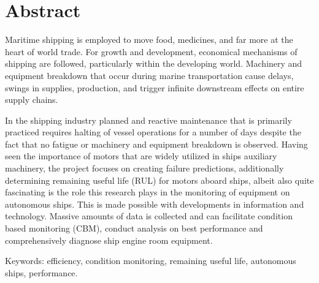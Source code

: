 
\section*{Abstract}
\label{sec:Abstract}
Maritime shipping is employed to move food, medicines, and far more at the heart of world
trade. For growth and development, economical mechanisms of shipping are followed,
particularly within the developing world. Machinery and equipment breakdown that occur
during marine transportation cause delays, swings in supplies, production, and trigger
infinite downstream effects on entire supply chains.

 In the shipping industry planned and
reactive maintenance that is primarily practiced requires halting of vessel operations for a
number of days despite the fact that no fatigue or machinery and equipment breakdown is
observed. Having seen the importance of motors that are widely utilized in ships auxiliary
machinery, the project focuses on creating failure predictions, additionally determining
remaining useful life (RUL) for motors aboard ships, albeit also quite fascinating is the
role this research plays in the monitoring of equipment on autonomous ships. This is
made possible with developments in information and technology. Massive amounts of
data is collected and can facilitate condition based monitoring (CBM), conduct analysis
on best performance and comprehensively diagnose ship engine room equipment.

Keywords: efficiency, condition monitoring, remaining useful life, autonomous ships, performance. 

 


